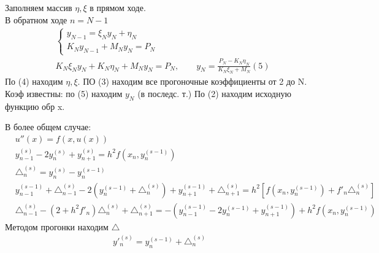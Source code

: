 \documentclass[12pt,a4paper]{article}
\begin{document}
	Заполняем массив $\eta, \xi$ в прямом ходе.\\
	В обратном ходе $n = N - 1$\\
	\begin{align*}
	&\begin{cases}
	y_{N-1} = \xi_N y_N + \eta_N\\
	K_N y_{N-1} + M_N y_N = P_N
	\end{cases}\\
	&K_N \xi_N y_N + K_N \eta_N + M_N y_N = P_N, \qquad y_N = \frac{P_N - K_N \eta_N}{K_N \xi_N + M_N} (5)
	\end{align*}
	По (4) находим $\eta, \xi$. ПО (3) находим все прогоночные коэффициенты от 2 до N. Коэф известны: по (5) находим $y_N$ (в последс. т.) По (2) находим исходную функцию обр x.
	
	В более общем случае:\\
	\begin{align*}
	&u''(x) = f(x, u(x))\\
	&y^{(s)}_{n-1} - 2y^{(s)}_n + y^{(s)}_{n+1} = h^2 f(x_n, y^{(s-1)}_n)\\
	&\triangle^{(s)}_n = y^{(s)}_n - y^{(s-1)}_n\\
	&y^{(s-1)}_{n-1} + \triangle^{(s)}_{n-1} - 2(y^{(s-1)}_n + \triangle^{(s)}_n ) + y^{(s-1)}_{n+1} + \triangle^{(s)}_{n+1} = h^2 \left[ f(x_n, y^{(s-1)}_n) + f'_n \triangle^{(s)}_n\right]\\
	&\triangle^{(s)}_{n-1} - (2 + h^2 f'_n) \triangle^{(s)}_n + \triangle^{(s)}_{n+1} = -(y^{(s-1)}_{n-1} - 2y^{(s-1)}_n + y^{(s-1)}_{n+1})+ h^2 f(x_n, y^{(s-1)}_n)
	\end{align*}
	Методом прогонки находим $\triangle$\\
	\begin{align*}
	y'^{(s)}_n = y^{(s-1)}_n + \triangle^{(s)}_n
	\end{align*}
\end{document}
